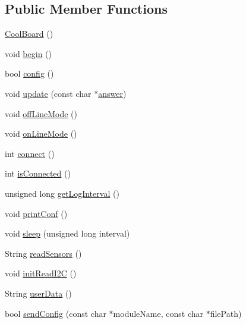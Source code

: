 \subsection*{Public Member Functions}
\begin{DoxyCompactItemize}
\item 
\hyperlink{class_cool_board_a8b88fd781e22e93025dd63474113b7e4}{Cool\+Board} ()
\item 
void \hyperlink{class_cool_board_acba7c5aef7268b2c0044bdb54d3b9d76}{begin} ()
\item 
bool \hyperlink{class_cool_board_a583a874c09c07e70a6eb9229fc4beddb}{config} ()
\item 
void \hyperlink{class_cool_board_a8612756d3f73198cdde857a66f0fe690}{update} (const char $\ast$\hyperlink{class_cool_board_a7b835fafd449e5282f7f91d787a2dc15}{answer})
\item 
void \hyperlink{class_cool_board_ae6b5e1274d760462290192acea4adca8}{off\+Line\+Mode} ()
\item 
void \hyperlink{class_cool_board_aa0bbc4bc605e35618d18e68795c61363}{on\+Line\+Mode} ()
\item 
int \hyperlink{class_cool_board_a519de78b807f8ec6463ff484eb925918}{connect} ()
\item 
int \hyperlink{class_cool_board_ad7442cf4b62c7b0d5bd62a0f75ffc065}{is\+Connected} ()
\item 
unsigned long \hyperlink{class_cool_board_a7508e029f2ee17bb747ffab599285e0d}{get\+Log\+Interval} ()
\item 
void \hyperlink{class_cool_board_a486507b8f0981d3cc671ed31c2145755}{print\+Conf} ()
\item 
void \hyperlink{class_cool_board_a069952cdcb2e7f68518aa429eceadb6e}{sleep} (unsigned long interval)
\item 
String \hyperlink{class_cool_board_ad03abdce2e65f520bbf2cff0f2d083cf}{read\+Sensors} ()
\item 
void \hyperlink{class_cool_board_a397b46fadab8f530a8cf4d914c561366}{init\+Read\+I2C} ()
\item 
String \hyperlink{class_cool_board_ae7358fb6e623cfc81b775f5f1734909b}{user\+Data} ()
\item 
bool \hyperlink{class_cool_board_a705398b11560603fcdd1b9e8e95d0027}{send\+Config} (const char $\ast$module\+Name, const char $\ast$file\+Path)
\end{DoxyCompactItemize}
